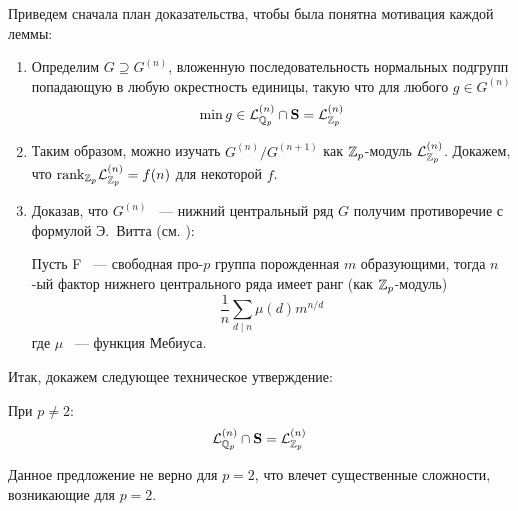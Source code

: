 Приведем сначала план доказательства, чтобы была понятна мотивация каждой леммы:
\begin{enumerate}
    \item Определим $G\supseteq G^{(n)}$, вложенную последовательность нормальных подгрупп попадающую в любую окрестность единицы, такую что для любого $g\in G^{(n)}$
    \[
        \min{g} \in \mathcal{L}^{(n)}_{\mathbb{Q}_p}\cap\mathbf{S} = \mathcal{L}^{(n)}_{\mathbb{Z}_p}
    \]
    \item Таким образом, можно изучать $G^{(n)}/G^{(n+1)}$ как $\mathbb{Z}_p$-модуль $\mathcal{L}^{(n)}_{\mathbb{Z}_p}$.
    Докажем, что $\mathrm{rank}_{\mathbb{Z}_p}{\mathcal{L}^{(n)}_{\mathbb{Z}_p}} = f(n)$ для некоторой $f$.
    \item Доказав, что $G^{(n)}$ ~--- нижний центральный ряд $G$ получим противоречие с формулой Э.\ Витта (см. \cite{Lubotzky}):~\begin{proposition}
                                                                                                                                      \label{thm:Vitt}
                                                                                                                                      Пусть F ~--- свободная про-$p$ группа порожденная $m$ образующими, тогда $n$-ый фактор нижнего центрального ряда имеет ранг (как $\mathbb{Z}_p$-модуль)
                                                                                                                                      \[
                                                                                                                                          \frac{1}{n}\sum\limits_{d\mid n} \mu(d) m^{n / d}
                                                                                                                                      \]
                                                                                                                                      где $\mu$ ~--- функция Мебиуса.
    \end{proposition}
\end{enumerate}
Итак, докажем следующее техническое утверждение:
\vskip 0.1in\noindent
\begin{proposition}
    \label{thm:LQn-to-LZn}
    При $p\neq 2$:
    \[
        \mathcal{L}^{(n)}_{\mathbb{Q}_p} \cap \mathbf{S} = \mathcal{L}^{(n)}_{\mathbb{Z}_p}
    \]
\end{proposition}
\begin{remark}
    Данное предложение не верно для $p=2$, что влечет существенные сложности, возникающие для $p=2$.
\end{remark}
